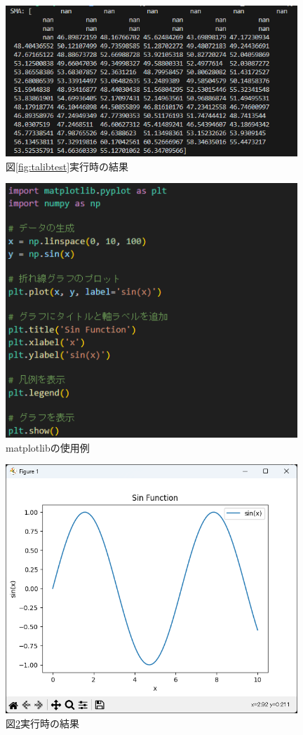 \begin{description}
   \begin{figure}[H]
    \centering
    \includegraphics[width=110mm]{fig/talib_res.png}
    \caption{図\ref{fig:talibtest}実行時の結果}
    \label{fig:talibres}
   \end{figure}
  \begin{figure}[H]
    \centering
    \includegraphics[width=110mm]{fig/plt_test.png}
    \caption{matplotlibの使用例}
    \label{fig:plttest}
   \end{figure}

   \begin{figure}[H]
    \centering
    \includegraphics[width=110mm]{fig/plt_res.png}
    \caption{図\ref{fig:plttest}実行時の結果}
    \label{fig:pltres}
   \end{figure}
\end{description}


\newpage
